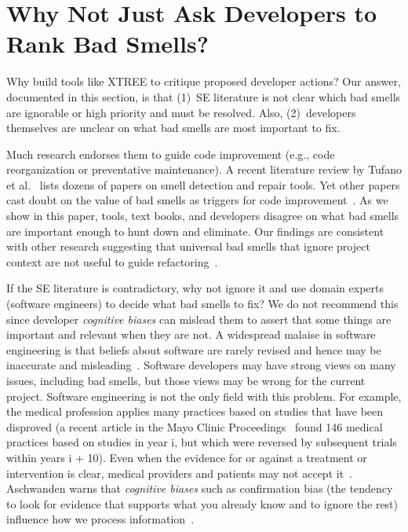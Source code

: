 \documentclass[twocolumn,5p]{elsarticle}
\theoremstyle{break}
\begin{document}
	
	
	\section{Why Not Just Ask Developers to Rank Bad Smells?}\label{sect:prelim}
	
	Why build tools like XTREE to  critique proposed developer actions?
	Our answer, documented in this section, is that (1)~SE literature is not clear which bad smells are ignorable or  high priority and must be resolved.
	Also, (2)~developers themselves are unclear on what bad smells are most important to fix.
	
	
	Much research endorses them to guide
	code improvement (e.g., code reorganization or preventative maintenance). A recent literature review by Tufano et al.~\cite{Tufano2015}  
	lists dozens of papers on smell detection and repair tools. 
	Yet
	other papers cast doubt on the value of bad smells
	as triggers for code improvement~\cite{Mantyla2004,Yamashita2013,Sjoberg2013}. 
	As we show in this paper,  
	tools, text books, and developers disagree on what bad smells
	are important enough to hunt down and eliminate. Our findings
	are consistent with other research suggesting that universal bad
	smells that ignore project context are not useful to guide refactoring~\cite{Mantyla2004,Yamashita2013,Sjoberg2013}.
	
	If the SE literature is contradictory, why not ignore it and use domain experts (software engineers) to decide
	what bad smells to fix? We do not recommend this since developer {\em cognitive biases} can mislead them to
	assert that some things are important and relevant when they are not. 
	A widespread malaise in software engineering is that
	beliefs about software are rarely revised and hence may be
	inaccurate and 
	misleading~\cite{passos11,jorgensen09,mei15,me16phase,prem16}. Software developers may have strong views on many issues, including bad smells, but those views may be wrong for the current
	project.
	Software engineering is not the only field with this problem.
	For example, the medical profession applies many practices based on studies that have been disproved (a recent article in the Mayo Clinic Proceedings~\cite{prasad13} found 146 medical practices based on studies in year i, but which were reversed by subsequent trials within years i + 10). Even when the evidence for or against a treatment or intervention is clear, medical providers and patients may not accept it~\cite{aschwanden10}. Aschwanden warns that {\em cognitive biases} such as confirmation bias (the tendency to look for evidence that supports what you already know and to ignore the rest) influence how we process information~\cite{aschwanden15}.
	
\end{document}
